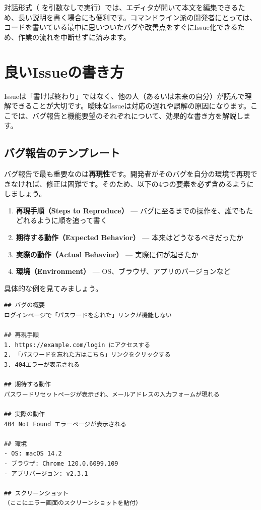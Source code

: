対話形式（ を引数なしで実行）では、エディタが開いて本文を編集できるため、長い説明を書く場合にも便利です。コマンドライン派の開発者にとっては、コードを書いている最中に思いついたバグや改善点をすぐにIssue化できるため、作業の流れを中断せずに済みます。

\section{良いIssueの書き方}

Issueは「書けば終わり」ではなく、他の人（あるいは未来の自分）が読んで理解できることが大切です。曖昧なIssueは対応の遅れや誤解の原因になります。ここでは、バグ報告と機能要望のそれぞれについて、効果的な書き方を解説します。

\subsection{バグ報告のテンプレート}

バグ報告で最も重要なのは\textbf{再現性}です。開発者がそのバグを自分の環境で再現できなければ、修正は困難です。そのため、以下の4つの要素を必ず含めるようにしましょう。

\begin{enumerate}
  \item \textbf{再現手順（Steps to Reproduce）} --- バグに至るまでの操作を、誰でもたどれるように順を追って書く
  \item \textbf{期待する動作（Expected Behavior）} --- 本来はどうなるべきだったか
  \item \textbf{実際の動作（Actual Behavior）} --- 実際に何が起きたか
  \item \textbf{環境（Environment）} --- OS、ブラウザ、アプリのバージョンなど
\end{enumerate}

具体的な例を見てみましょう。

\begin{lstlisting}[language={}]
## バグの概要
ログインページで「パスワードを忘れた」リンクが機能しない

## 再現手順
1. https://example.com/login にアクセスする
2. 「パスワードを忘れた方はこちら」リンクをクリックする
3. 404エラーが表示される

## 期待する動作
パスワードリセットページが表示され、メールアドレスの入力フォームが現れる

## 実際の動作
404 Not Found エラーページが表示される

## 環境
- OS: macOS 14.2
- ブラウザ: Chrome 120.0.6099.109
- アプリバージョン: v2.3.1

## スクリーンショット
（ここにエラー画面のスクリーンショットを貼付）
\end{lstlisting}

